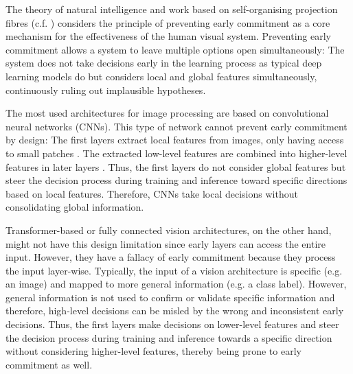 The theory of natural intelligence  and work based on self-organising projection fibres \cite{bienenstock_neural_1987, lades_distortion_1993, wiskott_face_1996, wiskott_face_1997, wolfrum_recurrent_2008, fernandes_self-organization_2015} (c.f. ) considers the principle of preventing early commitment as a core mechanism for the effectiveness of the human visual system.
Preventing early commitment allows a system to leave multiple options open simultaneously: The system does not take decisions early in the learning process as typical deep learning models do but considers local and global features simultaneously, continuously ruling out implausible hypotheses.

The most used architectures for image processing are based on convolutional neural networks  (CNNs). This type of network cannot prevent early commitment by design: The first layers extract local features from images, only having access to small patches \cite{lecun_backpropagation_1989}. The extracted low-level features are combined into higher-level features in later layers . Thus, the first layers do not consider global features but steer the decision process during training and inference toward specific directions based on local features. Therefore, CNNs take local decisions without consolidating global information.

Transformer-based  or fully connected  vision architectures, on the other hand, might not have this design limitation since early layers can access the entire input.
However, they have a fallacy of early commitment because they process the input layer-wise. Typically, the input of a vision architecture is specific (e.g. an image) and mapped to more general information (e.g. a class label).
However, general information is not used to confirm or validate specific information and therefore, high-level decisions can be misled by the wrong and inconsistent early decisions.
Thus, the first layers make decisions on lower-level features and steer the decision process during training and inference towards a specific direction without considering higher-level features, thereby being prone to early commitment as well.

